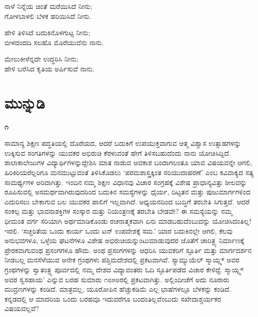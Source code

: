 \begin{center}
ನಾಳೆ ನಿನ್ನೆಯ ಚಿಂತೆ ಮರೆಯಿಸಿದೆ ನೀನು;\\ಗೋಳಬಾಳಲಿ ಬೆಳಕ ಹರಿಯಿಸಿದೆ ನೀನು.
\end{center}

\begin{center}
ಹೇಳಿ ತಿಳಿಸಿದೆ ಬದುಕಿನೊಳಗುಟ್ಟ ನೀನು;\\ಬೀಳದಂದದಿ ಸಲಹೊ ಮೊರೆಯುವೆನು ನಾನು.
\end{center}

\begin{center}
ಮೇಲುಕೀಳೆನ್ನದೇ ಉದ್ಧರಿಸಿ ನೀನು;\\ಹೇಳಿ ಬರೆಸಿದ ಕೃತಿಯ ಅರ್ಪಿಸುವೆ ನಾನು.
\end{center}


\chapter*{ಮುನ್ನುಡಿ}

\centerline{{\Large\bfseries ೧}}

ಸಾಮಾನ್ಯ ಶಿಕ್ಷಣ ಪದ್ಧತಿಯಲ್ಲಿ ದೊರೆಯದ, ಆದರೆ ಬದುಕಿಗೆ ಉಪಯುಕ್ತವಾಗುವ ಆತ್ಮ ವಿಶ್ವಾಸ ಉತ್ಸಾಹಗಳನ್ನು ಉಕ್ಕಿಸುವ ಸಂಗತಿಗಳನ್ನು ಯುವಕರ ಅಭಿರುಚಿ ಕೆರಳುವಂತೆ ಹೇಗೆ ತಿಳಿಸಬಹುದೆಂದು ನಾನು ಯೋಚಿಸಿದ್ದಿದೆ. ಶಾಲಾಕಾಲೇಜುಗಳ ವಿದ್ಯಾರ್ಥಿಗಳನ್ನುದ್ದೇಶಿಸಿ ಮಾತ ನಾಡುವ ಅವಕಾಶ ಬಂದಾಗಲಂತೂ ಯಾವ ವಿಷಯವನ್ನೇ ಆಗಲಿ, ಹಿರಿಕಿರಿಯರೆಲ್ಲರಿಗೂ ಮನಮುಟ್ಟುವಂತೆ ತಿಳಿಸಿಕೊಡಲು ‘ಪರಮಶಾಸ್ತ್ರಕ್ಕಿಂತ ಸರಿಯುದಾಹರಣೆ’ ಎಂಬ ಕವಿವಾಕ್ಯದ ಸತ್ಯ ಸಾಮರ್ಥ್ಯಗಳ ಅರಿವಾಗಿತ್ತು. ಇಂದಿನ ನಮ್ಮ ಶಿಕ್ಷಣ ವಿಧಾನವು ವಿಚಾರ ಸಂಗ್ರಹಕ್ಕೆ ವಿಶೇಷ ಪ್ರಾಧಾನ್ಯವಿತ್ತು ಶೀಲವನ್ನು ರೂಪಿಸುವಲ್ಲಿ ಅಸಮರ್ಥವಾಗಿರುವುದರಿಂದ ಬದುಕಿನ ಸಮಸ್ಯೆಗಳನ್ನು ಧೈರ್ಯ, ದಿಟ್ಟತನ ಮತ್ತು ಪುಜುಮಾರ್ಗಗಳಿಂದ ಎದುರಿಸಲು ಬೇಕಾಗುವ ಬಲ ಯುವಕರ ಪಾಲಿಗೆ ಇಲ್ಲವಾಗಿದೆ. ಅಧ್ಯಯನದಿಂದ ಬುದ್ಧಿಗೆ ತರಬೇತಿ ಸಿಗುತ್ತದೆ. ಆದರೆ ಸಂಕಲ್ಪ ಮತ್ತು ಭಾವನಾಶಕ್ತಿಗಳ ಸಂಸ್ಕಾರ ಮತ್ತು ನಿಯಂತ್ರಣಕ್ಕೆ ತರಬೇತಿ ಬೇಡವೇ? ಈ ಸಮಸ್ಯೆಯನ್ನು ನಮ್ಮ ಧೀಮಂತ ವರ್ಗ ಸರಿಯಾಗಿ ಅರ್ಥಮಾಡಿಕೊಂಡು ರಚನಾತ್ಮಕವಾಗಿ ಏನು ಮಾಡಬಹುದೆಂಬುದನ್ನು ಯೋಚಿಸಿದಂತಿಲ್ಲ! ಇರಲಿ. ‘ಸಚ್ಚರಿತೆಯ ಒಂದು ಕಾರ್ಯ ಒಂದು ಟನ್ ಉಪದೇಶಕ್ಕೆ ಸಮ.’ ಯಾರ ಬದುಕಿನಲ್ಲೇ ಆಗಲಿ, ಕೆಲವು ಅನುಭವಗಳೂ, ಒಳ್ಳೆಯ ಘಟನೆಗಳೂ ವಿಶೇಷ ಅಭಿರುಚಿಯನ್ನುಂಟುಮಾಡುವುದರ ಜೊತೆಗೆ ಚಾರಿತ್ರ್ಯ ನಿರ್ಮಾಣಕ್ಕೆ ಪ್ರೇರಕವಾಗುವಂಥ ಪ್ರಸಂಗಗಳೂ ಹೌದು. ಅಂಥ ಪ್ರಸಂಗಗಳನ್ನು ಆಧರಿಸಿ ಯುವಕರಿಗೆ ಸ್ಫೂರ್ತಿ ಮತ್ತು ಮಾರ್ಗದರ್ಶನ ನೀಡಬಲ್ಲ ಮನಸೆಳೆಯುವ ಅನೇಕ ಗ್ರಂಥಗಳು ಪಶ್ಚಿಮದೇಶದಲ್ಲಿ ಪ್ರಕಟವಾಗಿವೆ. ಸ್ಯಾಮ್ಯುಯೆಲ್ ಸ್ಮಾಯ್ಲ್ಸ್ ಅವರ ಗ್ರಂಥಗಳನ್ನು ಸ್ವಾತಂತ್ರ್ಯ ಪೂರ್ವದಲ್ಲಿ ನಮ್ಮ ದೇಶದ ವಿದ್ಯಾವಂತರು ಓದಿ ಸ್ಫೂರ್ತಿಪಡೆದ ವಿಚಾರ ಕೇಳಿದ್ದೆ. ಸ್ಮಾಯ್ಲ್ಸ್ ಅವರ ಸ್ವಸಹಾಯ’ ಎನ್ನುವ ಬರಹ ಸುಮಾರು ೧೮೫೮ರಲ್ಲಿ ಪ್ರಕಟವಾಗಿತ್ತು. ಅಲ್ಲಿಂದೀಚೆಗೆ ಅದು ನೂರಾರು ಮುದ್ರಣಗಳನ್ನು ಕಂಡಿದೆ. ಮಾತ್ರವಲ್ಲ, ಯೂರೋಪಿನ ಹೆಚ್ಚುಕಡಿಮೆ ಎಲ್ಲ ಭಾಷೆಗಳಲ್ಲೂ ಬೆಳಕನ್ನು ಕಂಡಿದೆ. ಕನ್ನಡದಲ್ಲಿ ಆ ಮಾದರಿಯ ಒಂದು ಬರಹವೂ ಇದುವರೆಗೂ ಬಂದಂತಿಲ್ಲವೆಂಬುದು ಸಖೇದಾಶ್ಚರ್ಯಕರ ವಿಷಯವಲ್ಲವೆ?

